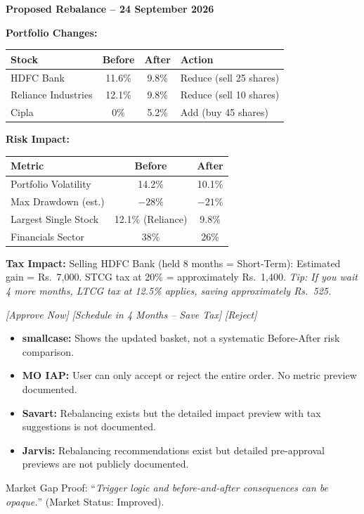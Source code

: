 \documentclass[12pt, a4paper, openany, oneside]{report}
\newcommand{\rupee}{Rs.~}
\begin{document}
\begin{examplebox}
\textbf{Proposed Rebalance -- 24 September 2026}

\textbf{Portfolio Changes:}
\begin{center}
\begin{tabular}{|l|c|c|l|}
\hline
\textbf{Stock} & \textbf{Before} & \textbf{After} & \textbf{Action} \\
\hline
HDFC Bank & 11.6\% & 9.8\% & Reduce (sell 25 shares) \\
Reliance Industries & 12.1\% & 9.8\% & Reduce (sell 10 shares) \\
Cipla & 0\% & 5.2\% & Add (buy 45 shares) \\
\hline
\end{tabular}
\end{center}

\textbf{Risk Impact:}
\begin{center}
\begin{tabular}{|l|c|c|}
\hline
\textbf{Metric} & \textbf{Before} & \textbf{After} \\
\hline
Portfolio Volatility & 14.2\% & 10.1\% \\
Max Drawdown (est.) & $-28\%$ & $-21\%$ \\
Largest Single Stock & 12.1\% (Reliance) & 9.8\% \\
Financials Sector & 38\% & 26\% \\
\hline
\end{tabular}
\end{center}

\textbf{Tax Impact:} Selling HDFC Bank (held 8 months = Short-Term): Estimated gain = \rupee7,000. STCG tax at 20\% = approximately \rupee1,400. \textit{Tip: If you wait 4 more months, LTCG tax at 12.5\% applies, saving approximately \rupee525.}

\textit{[Approve Now]} \quad \textit{[Schedule in 4 Months -- Save Tax]} \quad \textit{[Reject]}
\end{examplebox}

\begin{gapbox}
\begin{itemize}[noitemsep]
  \item \textbf{smallcase:} Shows the updated basket, not a systematic Before-After risk comparison.
  \item \textbf{MO IAP:} User can only accept or reject the entire order. No metric preview documented.
  \item \textbf{Savart:} Rebalancing exists but the detailed impact preview with tax suggestions is not documented.
  \item \textbf{Jarvis:} Rebalancing recommendations exist but detailed pre-approval previews are not publicly documented.
\end{itemize}
Market Gap Proof: ``\textit{Trigger logic and before-and-after consequences can be opaque.}'' (Market Status: Improved).
\end{gapbox}
\end{document}
